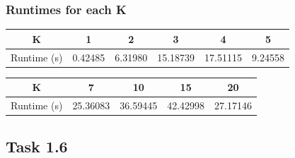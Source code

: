 \documentclass{article}
\begin{document}
\subsubsection*{Runtimes for each K}

\begin{tabular}{ |c|c|c|c|c|c| } 
 \hline
 K & 1 & 2 & 3 & 4 & 5 \\ 
 \hline
 Runtime (s) & 0.42485 & 6.31980 & 15.18739 & 17.51115 & 9.24558 \\
 \hline
\end{tabular}


\begin{tabular}{ |c|c|c|c|c| } 
 \hline
 K & 7 & 10 & 15 & 20 \\ 
 \hline
 Runtime (s) & 25.36083 & 36.59445 & 42.42998 & 27.17146 \\
 \hline
\end{tabular}


\newpage
\subsection*{Task 1.6}
\end{document}
